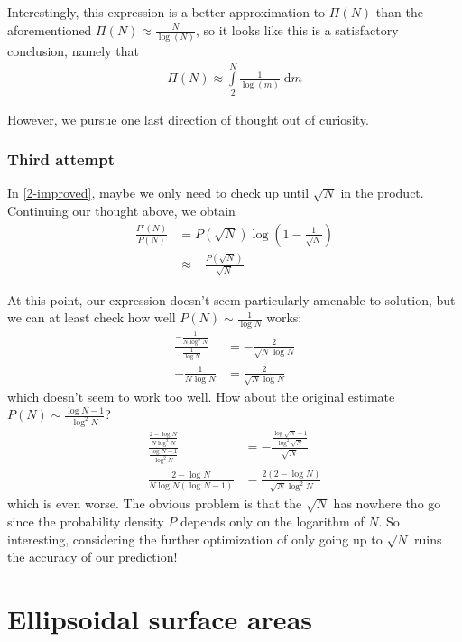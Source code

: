 \documentclass[12pt]{report}
\begin{document}
Interestingly, this expression is a better approximation to $\Pi(N)$ than the
aforementioned $\Pi(N) \approx \frac{N}{\log(N)}$, so it looks like this is a
satisfactory conclusion, namely that
\begin{align}
    \Pi(N) \approx \int\limits_{2}^{N}\frac{1}{\log(m)}\;\mathrm{d}m
\end{align}

However, we pursue one last direction of thought out of curiosity.

\subsection{Third attempt}

In \autoref{2-improved}, maybe we only need to check up until $\sqrt{N}$ in the
product. Continuing our thought above, we obtain
\begin{align}
    \frac{P'(N)}{P(N)} &= P(\sqrt{N})\log\left( 1 - \frac{1}{\sqrt{N}} \right)\\
    &\approx -\frac{P(\sqrt{N})}{\sqrt{N}}
\end{align}

At this point, our expression doesn't seem particularly amenable to solution,
but we can at least check how well $P(N) \sim \frac{1}{\log N}$ works:
\begin{align}
    \frac{-\frac{1}{N\log^2N}}{\frac{1}{\log N}} &= -\frac{2}{\sqrt{N}\log N}\\
    -\frac{1}{N\log N} &= \frac{2}{\sqrt{N}\log N}
\end{align}
which doesn't seem to work too well. How about the original estimate $P(N) \sim
\frac{\log N - 1}{\log^2 N}$?
\begin{align}
    \frac{\frac{2 - \log N}{N\log^3 N}}{\frac{\log N - 1}{\log^2 N}} &=
    - \frac{\frac{\log\sqrt{N} - 1}{\log^2\sqrt{N}}}{\sqrt{N}}\\
    \frac{2 - \log N}{N\log N \left( \log N - 1 \right)} &= \frac{2\left( 2 -
    \log N\right)}{\sqrt{N}\log^2 N}
\end{align}
which is even worse. The obvious problem is that the $\sqrt{N}$ has nowhere tho
go since the probability density $P$ depends only on the logarithm of $N$. So
interesting, considering the further optimization of only going up to $\sqrt{N}$
ruins the accuracy of our prediction!

\clearpage
\chapter{Ellipsoidal surface areas}
\end{document}
